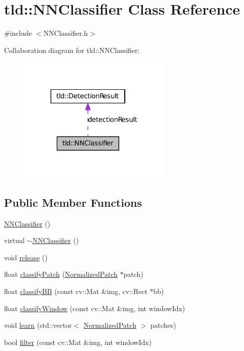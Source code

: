 \hypertarget{classtld_1_1_n_n_classifier}{
\section{tld::NNClassifier Class Reference}
\label{classtld_1_1_n_n_classifier}
}


{\ttfamily \#include $<$NNClassifier.h$>$}



Collaboration diagram for tld::NNClassifier:
\nopagebreak
\begin{figure}[H]
\begin{center}
\leavevmode
\includegraphics[width=209pt]{classtld_1_1_n_n_classifier__coll__graph}
\end{center}
\end{figure}
\subsection*{Public Member Functions}
\begin{DoxyCompactItemize}
\item 
\hyperlink{classtld_1_1_n_n_classifier_a5a71057c2aacdd4935247976e6f49b46}{NNClassifier} ()
\item 
virtual \hyperlink{classtld_1_1_n_n_classifier_a475f200dea8dc71cf0f273c57d837242}{$\sim$NNClassifier} ()
\item 
void \hyperlink{classtld_1_1_n_n_classifier_aabb548e7b9535ad8040fe65d344b3142}{release} ()
\item 
float \hyperlink{classtld_1_1_n_n_classifier_aa59628d72a448c3ee686d9fd78d3e62a}{classifyPatch} (\hyperlink{classtld_1_1_normalized_patch}{NormalizedPatch} $\ast$patch)
\item 
float \hyperlink{classtld_1_1_n_n_classifier_a4b926da10ab0ce0d05fdb19b7e90bf8b}{classifyBB} (const cv::Mat \&img, cv::Rect $\ast$bb)
\item 
float \hyperlink{classtld_1_1_n_n_classifier_a88fe1649014e887a12a5a57a552819f2}{classifyWindow} (const cv::Mat \&img, int windowIdx)
\item 
void \hyperlink{classtld_1_1_n_n_classifier_aa6a34e43628807018da166897063ea02}{learn} (std::vector$<$ \hyperlink{classtld_1_1_normalized_patch}{NormalizedPatch} $>$ patches)
\item 
bool \hyperlink{classtld_1_1_n_n_classifier_a173e8f32e073d88c93203ff6ec3352ab}{filter} (const cv::Mat \&img, int windowIdx)
\end{DoxyCompactItemize}
